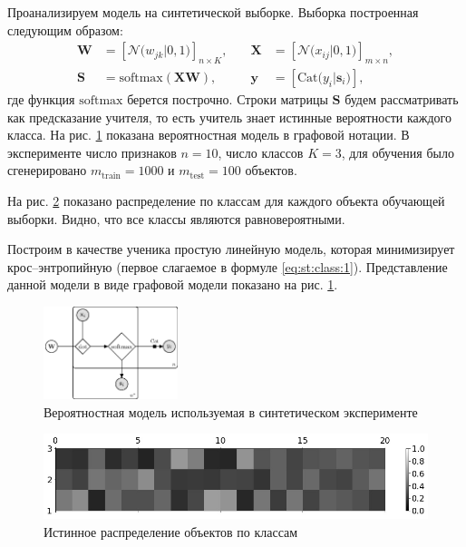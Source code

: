 Проанализируем модель на синтетической выборке. Выборка построенная следующим образом:
\[
\begin{aligned}
\mathbf{W} &= \left[\mathcal{N}\bigr(w_{jk}|0, 1\bigr)\right]_{n\times K}, \quad &\mathbf{X} &= \left[\mathcal{N}\bigr(x_{ij}|0, 1\bigr)\right]_{m\times n}, \\
 \mathbf{S} &= \text{softmax}\left(\mathbf{XW}\right), \quad &\mathbf{y} &= \left[\text{Cat}\bigr(y_i| \mathbf{s}_i\bigr)\right],
\end{aligned}
\]
где функция $\text{softmax}$ берется построчно. Строки матрицы $\mathbf{S}$ будем рассматривать как предсказание учителя, то есть учитель знает истинные вероятности каждого класса. На рис. \ref{fg:ex:synt:plate} показана вероятностная модель в графовой нотации. В эксперименте число признаков $n=10$, число классов $K=3$, для обучения было сгенерировано $m_{\text{train}}=1000$ и $m_{\text{test}}=100$ объектов.

На рис. \ref{fg:ex:synt:distr:real} показано распределение по классам для каждого объекта обучающей выборки. Видно, что все классы являются равновероятными.

Построим в качестве ученика простую линейную модель, которая минимизирует крос--энтропийную (первое слагаемое в формуле \eqref{eq:st:class:1}). Представление данной модели в виде графовой модели показано на рис. \ref{fg:ex:synt:plate}.

\begin{figure}[h!t]\center
\includegraphics[width=0.35\textwidth]{results/privlearn/linear_model}
\caption{Вероятностная модель используемая в синтетическом эксперименте}
\label{fg:ex:synt:plate}
\end{figure}

\begin{figure}[h!t]\center
\includegraphics[width=1\textwidth]{results/privlearn/syn_real_distr}
\caption{Истинное распределение  объектов по классам}
\label{fg:ex:synt:distr:real}
\end{figure}


